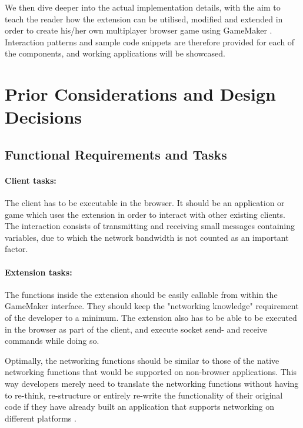 \documentclass[bsc, 12pt, twoside, singlespacing, parskip, abbrevs, notimes, normalheadings, logo]{styles/infthesis}
\begin{document}
We then dive deeper into the actual implementation details, with the aim to teach the reader how the extension can be utilised, modified and extended in order to create his/her own multiplayer browser game using GameMaker \cite{SE_7_Principles}. Interaction patterns and sample code snippets are therefore provided for each of the components, and working applications will be showcased.


\section{Prior Considerations and Design Decisions}

\subsection{Functional Requirements and Tasks}
\paragraph*{Client tasks:}
The client has to be executable in the browser. It should be an application or game which uses the extension in order to interact with other existing clients. The interaction consists of transmitting and receiving small messages containing variables, due to which the network bandwidth is not counted as an important factor.

\paragraph*{Extension tasks:}
The functions inside the extension should be easily callable from within the GameMaker interface. They should keep the "networking knowledge" requirement of the developer to a minimum. The extension also has to be able to be executed in the browser as part of the client, and execute socket send- and receive commands while doing so.

Optimally, the networking functions should be similar to those of the native networking functions that would be supported on non-browser applications. This way developers merely need to translate the networking functions without having to re-think, re-structure or entirely  re-write the functionality of their original code if they have already built an application that supports networking on different platforms \cite{Software_Engineering}.
\end{document}
